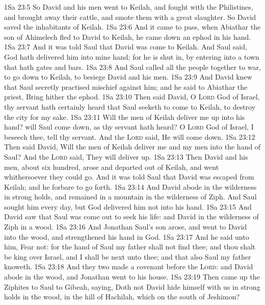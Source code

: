 \vs 1Sa 23:5 So David and his men went to Keilah, and fought with the Philistines, and brought away their cattle, and smote them with a great slaughter. So David saved the inhabitants of Keilah.
\vs 1Sa 23:6 And it came to pass, when Abiathar the son of Ahimelech fled to David to Keilah,  he came down  an ephod in his hand.
\vs 1Sa 23:7 And it was told Saul that David was come to Keilah. And Saul said, God hath delivered him into mine hand; for he is shut in, by entering into a town that hath gates and bars.
\vs 1Sa 23:8 And Saul called all the people together to war, to go down to Keilah, to besiege David and his men.
\vs 1Sa 23:9 And David knew that Saul secretly practised mischief against him; and he said to Abiathar the priest, Bring hither the ephod.
\vs 1Sa 23:10 Then said David, O \textsc{Lord} God of Israel, thy servant hath certainly heard that Saul seeketh to come to Keilah, to destroy the city for my sake.
\vs 1Sa 23:11 Will the men of Keilah deliver me up into his hand? will Saul come down, as thy servant hath heard? O \textsc{Lord} God of Israel, I beseech thee, tell thy servant. And the \textsc{Lord} said, He will come down.
\vs 1Sa 23:12 Then said David, Will the men of Keilah deliver me and my men into the hand of Saul? And the \textsc{Lord} said, They will deliver  up.
\vs 1Sa 23:13 Then David and his men,  about six hundred, arose and departed out of Keilah, and went whithersoever they could go. And it was told Saul that David was escaped from Keilah; and he forbare to go forth.
\vs 1Sa 23:14 And David abode in the wilderness in strong holds, and remained in a mountain in the wilderness of Ziph. And Saul sought him every day, but God delivered him not into his hand.
\vs 1Sa 23:15 And David saw that Saul was come out to seek his life: and David  in the wilderness of Ziph in a wood.
\vs 1Sa 23:16 And Jonathan Saul's son arose, and went to David into the wood, and strengthened his hand in God.
\vs 1Sa 23:17 And he said unto him, Fear not: for the hand of Saul my father shall not find thee; and thou shalt be king over Israel, and I shall be next unto thee; and that also Saul my father knoweth.
\vs 1Sa 23:18 And they two made a covenant before the \textsc{Lord}: and David abode in the wood, and Jonathan went to his house.
\vs 1Sa 23:19 Then came up the Ziphites to Saul to Gibeah, saying, Doth not David hide himself with us in strong holds in the wood, in the hill of Hachilah, which  on the south of Jeshimon?
